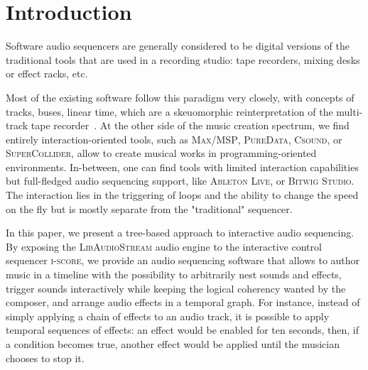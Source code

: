 \documentclass{article}
\title{\papertitle}
\newcommand*{\LibAudioStream}{\textsc{LibAudioStream}\xspace}
\newcommand*{\iscore}{\textsc{i-score}\xspace}
\newcommand*{\maxmsp}{\textsc{Max/MSP}\xspace}
\newcommand*{\puredata}{\textsc{PureData}\xspace}
\newcommand*{\csound}{\textsc{Csound}\xspace}
\newcommand*{\supercollider}{\textsc{SuperCollider}\xspace}
\newcommand*{\abletonlive}{\textsc{Ableton Live}\xspace}
\newcommand*{\bitwigstudio}{\textsc{Bitwig Studio}\xspace}
\begin{document}
\capstartfalse
\maketitle
\capstarttrue

\begin{abstract}
The field of digital music authoring provides a wealth of creative environments in which music can be created and authored : patchers, programming languages, and multitrack sequencers.
By combining the \iscore interactive sequencer to the \LibAudioStream audio engine, a new music software able to represent and play rich interactive audio sequences is introduced.
We present new stream expressions compatible with the \LibAudioStream, and 
use them to create an interactive audio graph : hierarchical stream and send - return streams.
This allows to create branching and arbitrarily nested musical scores, in an OSC-centric environment.
Three examples of interactive musical scores are presented : the recreation of a traditional multi-track sequencer, an interactive musical score, and a temporal effect graph.
\end{abstract}

\section{Introduction}
Software audio sequencers are generally considered to be digital versions 
of the traditional tools that are used in a recording studio: tape recorders, 
mixing desks or effect racks, etc.

Most of the existing software follow this paradigm very closely, with 
concepts of tracks, buses, linear time, which are a skeuomorphic reinterpretation of the multi-track tape recorder~\cite{bell2015skeuomorphism}.
At the other side of the music creation spectrum, we find entirely interaction-oriented tools, 
such as \maxmsp, \puredata, \csound, or \supercollider, allow to create musical works in programming-oriented 
environments.
In-between, one can find tools with limited interaction capabilities but full-fledged audio sequencing support, 
like \abletonlive, or \bitwigstudio.
The interaction lies in the triggering of loops and the ability to change the speed on the fly but is mostly separate from the "traditional" sequencer.

In this paper, we present a tree-based approach to interactive audio sequencing.
By exposing the \LibAudioStream audio engine to the interactive control sequencer \iscore, 
we provide an audio sequencing software that allows to author music in a timeline 
with the possibility to arbitrarily nest sounds and effects, trigger sounds interactively 
while keeping the logical coherency wanted by the composer, and arrange audio effects in a temporal graph.
For instance, instead of simply applying a chain of effects to an audio track, it is possible to apply temporal sequences of effects: an effect would be enabled for ten seconds, then, if a condition becomes true, another effect would be applied until the musician chooses to stop it.
\end{document}

